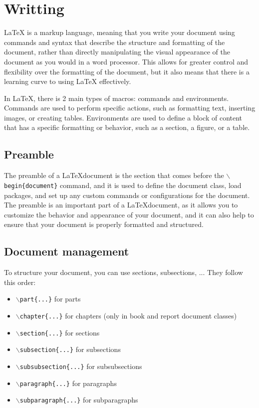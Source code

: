 \section{Writting}

LaTeX is a markup language, meaning that you write your document using commands and syntax that describe the structure and formatting of the document, rather than directly manipulating the visual appearance of the document as you would in a word processor. This allows for greater control and flexibility over the formatting of the document, but it also means that there is a learning curve to using LaTeX effectively.

In LaTeX, there is 2 main types of macros: commands and environments. Commands are used to perform specific actions, such as formatting text, inserting images, or creating tables. Environments are used to define a block of content that has a specific formatting or behavior, such as a section, a figure, or a table.

\subsection{Preamble}

The preamble of a \LaTeX document is the section that comes before the \texttt{\(\backslash\)begin\{document\}} command, and it is used to define the document class, load packages, and set up any custom commands or configurations for the document. The preamble is an important part of a \LaTeX document, as it allows you to customize the behavior and appearance of your document, and it can also help to ensure that your document is properly formatted and structured.

\subsection{Document management}

To structure your document, you can use sections, subsections, ... They follow this order:
  \begin{itemize}
    \item \texttt{\(\backslash\)part\{...\}} for parts
    \item \texttt{\(\backslash\)chapter\{...\}} for chapters (only in book and report document classes)
    \item \texttt{\(\backslash\)section\{...\}} for sections
    \item \texttt{\(\backslash\)subsection\{...\}} for subsections
    \item \texttt{\(\backslash\)subsubsection\{...\}} for subsubsections
    \item \texttt{\(\backslash\)paragraph\{...\}} for paragraphs
    \item \texttt{\(\backslash\)subparagraph\{...\}} for subparagraphs
  \end{itemize}

